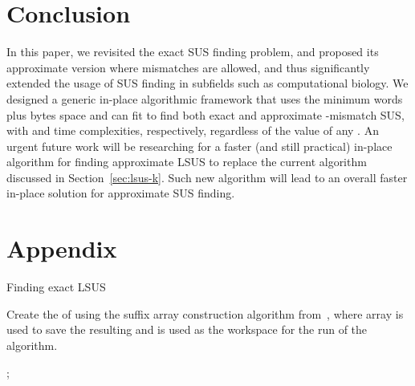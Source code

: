 \documentclass[11pt]{llncs}
\begin{document}
\section{Conclusion}
In this paper, we revisited the exact SUS finding problem, and
proposed its approximate version where mismatches are allowed, and
thus significantly extended the usage of SUS finding in subfields such
as computational biology. We designed a generic in-place algorithmic
framework that uses the minimum  words plus  bytes space and
can fit to find both exact and approximate -mismatch SUS, with
 and  time complexities, respectively, regardless of the
value of any . 
An urgent future work will be researching for a faster (and still
practical) in-place algorithm for finding approximate LSUS to replace
the current algorithm discussed in Section~\ref{sec:lsus-k}.  Such new
algorithm will lead to an overall faster in-place solution for
approximate SUS finding.



\small





\newpage

\appendix

\section*{Appendix}


\begin{algorithm}[h!]
 \caption{Finding exact LSUS}
\label{algo:lsus-exact}

\bigskip 

Create the  of  using the suffix array construction algorithm
from~\cite{Nong-TIS2013}, where array  is used to save the
resulting  and  is used as the workspace for the run of the
algorithm. 

\medskip 

\lFor{}{}

\medskip 



\medskip 

;
\;

\end{algorithm}
\end{document}

